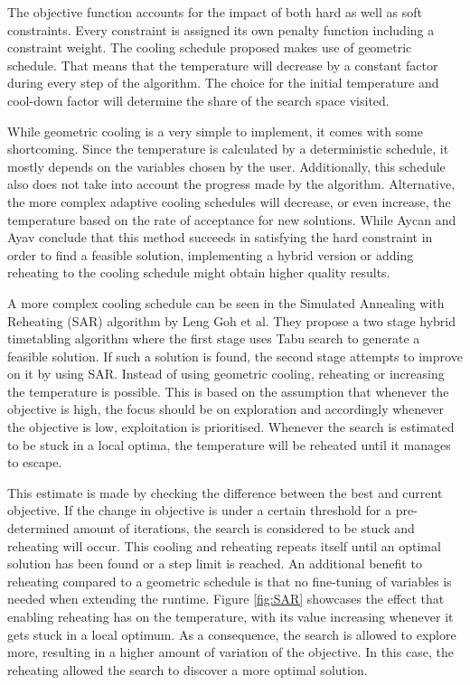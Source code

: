 The objective function accounts for the impact of both hard as well as soft constraints. Every constraint is assigned its own penalty function including a constraint weight. The cooling schedule proposed makes use of geometric schedule. That means that the temperature will decrease by a constant factor during every step of the algorithm. The choice for the initial temperature and cool-down factor will determine the share of the search space visited. 

While geometric cooling is a very simple to implement, it comes with some shortcoming. Since the temperature is calculated by a deterministic schedule, it mostly depends on the variables chosen by the user. Additionally, this schedule also does not take into account the progress made by the algorithm. Alternative, the more complex adaptive cooling schedules will decrease, or even increase, the temperature based on the rate of acceptance for new solutions. While Aycan and Ayav conclude that this method succeeds in satisfying the hard constraint in order to find a feasible solution, implementing a hybrid version or adding reheating to the cooling schedule might obtain higher quality results.

A more complex cooling schedule can be seen in the Simulated Annealing with Reheating (SAR) algorithm by Leng Goh et al.\cite{Goh2017} They propose a two stage hybrid timetabling algorithm where the first stage uses Tabu search to generate a feasible solution. If such a solution is found, the second stage attempts to improve on it by using SAR. Instead of using geometric cooling, reheating or increasing the temperature is possible. This is based on the assumption that whenever the objective is high, the focus should be on exploration and accordingly whenever the objective is low, exploitation is prioritised. Whenever the search is estimated to be stuck in a local optima, the temperature will be reheated until it manages to escape. 

This estimate is made by checking the difference between the best and current objective. If the change in objective is under a certain threshold for a pre-determined amount of iterations, the search is considered to be stuck and reheating will occur. This cooling and reheating repeats itself until an optimal solution has been found or a step limit is reached. An additional benefit to reheating compared to a geometric schedule is that no fine-tuning of variables is needed when extending the runtime. Figure \ref{fig:SAR} showcases the effect that enabling reheating has on the temperature, with its value increasing whenever it gets stuck in a local optimum. As a consequence, the search is allowed to explore more, resulting in a higher amount of variation of the objective. In this case, the reheating allowed the search to discover a more optimal solution.

